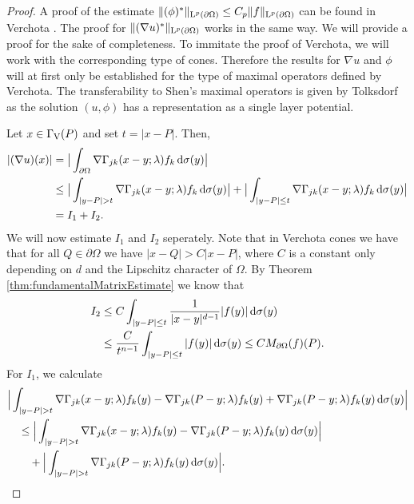 \begin{proof}
  A proof of the estimate $\|(\phi)^*\|_{\mathrm{L}^p(\partial\Omega)} \leq C_p \|f\|_{\mathrm{L}^p(\partial\Omega)}$ can be found in Verchota \cite{verchota}.
  The proof for $\|(\nabla u)^*\|_{\mathrm{L}^p(\partial\Omega)}$ works in the same way. 
  We will provide a proof for the sake of completeness.
  To immitate the proof of Verchota, we will work with the corresponding type of cones.
  Therefore the results for $\nabla u$ and $\phi$ will at first only be established for the type of maximal operators defined by Verchota.
  The transferability to Shen's maximal operators is given by Tolksdorf \cite{tolksdorfDiss} as the solution $(u,\phi)$ has a representation as a single layer potential.

  Let $x \in \Gamma_\mathrm{V}(P)$ and set $t = |x - P|$.
  Then,
  \begin{align*}
    |(\nabla u)(x) |
    &= \big| \int_{\partial\Omega} \nabla \Gamma_{jk} (x - y; \lambda) f_k \, {\operatorname{d}\!{\sigma}}(y)\big| \\
    &\leq \big| \int_{|y - P| > t} \nabla\Gamma_{jk}(x - y; \lambda) f_k \, {\operatorname{d}\!{\sigma}}(y) \big| + \big| \int_{|y - P| \leq t} \nabla \Gamma_{jk}(x - y; \lambda) f_k \, {\operatorname{d}\!{\sigma}}(y)\big| \\
    &= I_1 + I_2.
  \end{align*}
  We will now estimate $I_1$ and $I_2$ seperately.
  Note that in Verchota cones we have that for all $Q \in \partial\Omega$ we have $|x - Q| > C |x - P|$, where $C$ is a constant only depending on $d$ and the Lipschitz character of $\Omega$.
  By Theorem \ref{thm:fundamentalMatrixEstimate} we know that
  \begin{align*}
    I_2 
    &\leq C \int_{|y - P| \leq t} \frac{1}{|x - y|^{d - 1}} |f(y)| \, {\operatorname{d}\!{\sigma}}(y) \\
    &\leq \frac{C}{t^{n - 1}} \int_{|y - P| \leq t} |f(y)| \, {\operatorname{d}\!{\sigma}}(y)
    \leq C M_{\partial\Omega} (f)(P).
  \end{align*}
  For $I_1$, we calculate
  \begin{align*}
    &\Big| \int_{| y - P | > t} \nabla \Gamma_{j k} (x - y; \lambda) f_k(y) - \nabla \Gamma_{jk}(P - y; \lambda) f_k(y) + \nabla \Gamma_{jk}(P - y; \lambda) f_k(y) \, {\operatorname{d}\!{\sigma}}(y) \Big| \\
    &\quad\leq \Big| \int_{|y - P| > t} \nabla\Gamma_{jk} (x - y; \lambda) f_k(y) - \nabla\Gamma_{jk}(P - y; \lambda) f_k(y) \, {\operatorname{d}\!{\sigma}}(y) \Big| \\
    &\qquad+ \Big| \int_{|y - P| > t} \nabla\Gamma_{jk}(P - y; \lambda) f_k(y) \, {\operatorname{d}\!{\sigma}}(y) \Big|.
  \end{align*}

\end{proof}
